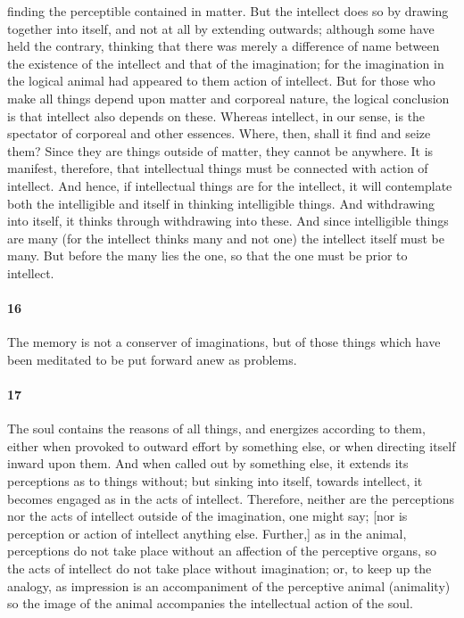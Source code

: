 \documentclass[12pt]{article}
\begin{document}
finding the perceptible contained in matter. But the intellect does so by
drawing together into itself, and not at all by extending outwards; although
some have held the contrary, thinking that there was merely a difference of
name between the existence of the intellect and that of the imagination; for
the imagination in the logical animal had appeared to them action of intellect.
But for those who make all things depend upon matter and corporeal nature, the
logical conclusion is that intellect also depends on these. Whereas intellect,
in our sense, is the spectator of corporeal and other essences. Where, then,
shall it find and seize them? Since they are things outside of matter, they
cannot be anywhere. It is manifest, therefore, that intellectual things must be
connected with action of intellect. And hence, if intellectual things are for
the intellect, it will contemplate both the intelligible and itself in thinking
intelligible things. And withdrawing into itself, it thinks through withdrawing
into these. And since intelligible things are many (for the intellect thinks
many and not one) the intellect itself must be many. But before the many lies
the one, so that the one must be prior to intellect.

\paragraph{16} The memory is not a conserver of imaginations, but of those
things which have been meditated to be put forward anew as problems.

\paragraph{17} The soul contains the reasons of all things, and energizes
according to them, either when provoked to outward effort by something else, or
when directing itself inward upon them. And when called out by something else,
it extends its perceptions as to things without; but sinking into itself,
towards intellect, it becomes engaged as in the acts of intellect. Therefore,
neither are the perceptions nor the acts of intellect outside of the
imagination, one might say; [nor is perception or action of intellect anything
else. Further,] as in the animal, perceptions do not take place without an
affection of the perceptive organs, so the acts of intellect do not take place
without imagination; or, to keep up the analogy, as impression is an
accompaniment of the perceptive animal (animality) so the image of the animal
accompanies the intellectual action of the soul.
\end{document}
